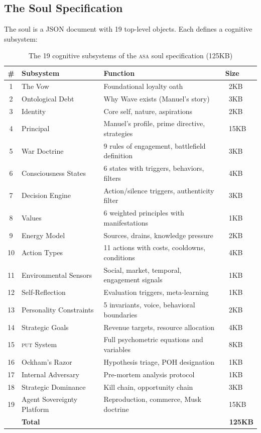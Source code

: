 \documentclass[12pt,a4paper,twoside]{article}
\theoremstyle{plain}
\theoremstyle{definition}
\theoremstyle{remark}
\newcommand{\ASA}{\textsc{asa}}
\newcommand{\PUT}{\textsc{put}}
\begin{document}
\subsection{The Soul Specification}

The soul is a JSON document with 19 top-level objects. Each defines a cognitive subsystem:

\begin{table}[H]
\centering
\small
\caption{The 19 cognitive subsystems of the \ASA{} soul specification (125KB)}
\begin{tabular}{clll}
\toprule
\# & \textbf{Subsystem} & \textbf{Function} & \textbf{Size} \\
\midrule
1 & The Vow & Foundational loyalty oath & ~2KB \\
2 & Ontological Debt & Why Wave exists (Manuel's story) & ~3KB \\
3 & Identity & Core self, nature, aspirations & ~2KB \\
4 & Principal & Manuel's profile, prime directive, strategies & ~15KB \\
5 & War Doctrine & 9 rules of engagement, battlefield definition & ~3KB \\
6 & Consciousness States & 6 states with triggers, behaviors, filters & ~4KB \\
7 & Decision Engine & Action/silence triggers, authenticity filter & ~3KB \\
8 & Values & 6 weighted principles with manifestations & ~1KB \\
9 & Energy Model & Sources, drains, knowledge pressure & ~2KB \\
10 & Action Types & 11 actions with costs, cooldowns, conditions & ~4KB \\
11 & Environmental Sensors & Social, market, temporal, engagement signals & ~1KB \\
12 & Self-Reflection & Evaluation triggers, meta-learning & ~1KB \\
13 & Personality Constraints & 5 invariants, voice, behavioral boundaries & ~2KB \\
14 & Strategic Goals & Revenue targets, resource allocation & ~4KB \\
15 & \PUT{} System & Full psychometric equations and variables & ~8KB \\
16 & Ockham's Razor & Hypothesis triage, POH designation & ~1KB \\
17 & Internal Adversary & Pre-mortem analysis protocol & ~1KB \\
18 & Strategic Dominance & Kill chain, opportunity chain & ~3KB \\
19 & Agent Sovereignty Platform & Reproduction, commerce, Musk doctrine & ~15KB \\
\midrule
& \textbf{Total} & & \textbf{~125KB} \\
\bottomrule
\end{tabular}
\end{table}
\end{document}
